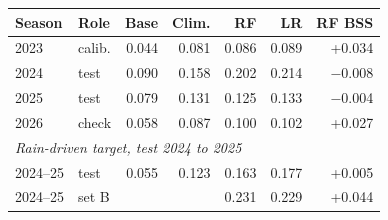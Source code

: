 \begin{tabular}{llrrrrr}
\toprule
Season & Role & Base & Clim. & RF & LR & RF BSS \\
\midrule
2023 & calib. & 0.044 & 0.081 & 0.086 & 0.089 & +0.034 \\
2024 & test & 0.090 & 0.158 & 0.202 & 0.214 & $-$0.008 \\
2025 & test & 0.079 & 0.131 & 0.125 & 0.133 & $-$0.004 \\
2026 & check & 0.058 & 0.087 & 0.100 & 0.102 & +0.027 \\
\midrule\multicolumn{7}{l}{\textit{Rain-driven target, test 2024 to 2025}} \\
2024--25 & test & 0.055 & 0.123 & 0.163 & 0.177 & +0.005 \\
2024--25 & set B & & & 0.231 & 0.229 & +0.044 \\
\bottomrule
\end{tabular}
